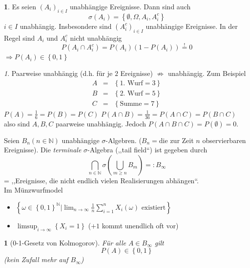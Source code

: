 \documentclass[10pt,a4paper]{report}
\numberwithin{equation}{section}
\numberwithin{figure}{section}
\theoremstyle{plain}
\theoremstyle{definition}
\newtheorem{example}[thm]{\protect\examplename}
\theoremstyle{remark}
\newtheorem{rem}[thm]{\protect\remarkname}
\theoremstyle{plain}
\newtheorem{prop}[thm]{\protect\propositionname}
\providecommand{\examplename}{Beispiel}
\providecommand{\propositionname}{Satz}
\providecommand{\remarkname}{Bemerkung}
\newcommand{\1}{ \mathbb{1} } %
\begin{document}
\begin{example}
  Es seien $\left(A_{i}\right)_{i\in I}$ unabhängige Ereignisse. Dann
  sind auch 
  \[
  \sigma\left(A_{i}\right)=\left\{ \emptyset,\Omega,A_{i},A_{i}^{c}\right\} 
  \]
  $i\in I$ unabhängig. Insbesondere sind $\left(A_{i}^{c}\right)_{i\in I}$
  unabhängige Ereignisse. In der Regel sind $A_{i}$ und $A_{i}^{c}$
  nicht unabhängig
  \[
  P\left(A_{i}\cap A_{i}^{c}\right)=P\left(A_{i}\right)\left(1-P\left(A_{i}\right)\right)\overset{!}{=}0
  \]
  $\Rightarrow P\left(A_{i}\right)\in\left\{ 0,1\right\} $
\end{example}
\begin{rem}
  Paarweise unabhängig (d.h. für je $2$ Ereignisse) $\not\Rightarrow$
  unabhängig. Zum Beispiel
  \begin{eqnarray*}
    A & = & \left\{ \text{1. Wurf}=3\right\} \\
    B & = & \left\{ \text{2. Wurf}=5\right\} \\
    C & = & \left\{ \text{Summe}=7\right\} 
  \end{eqnarray*}
  $P\left(A\right)=\frac{1}{6}=P\left(B\right)=P\left(C\right)$ $P\left(A\cap B\right)=\frac{1}{36}=P\left(A\cap C\right)=P\left(B\cap C\right)$
  also sind $A,B,C$ paarweise unabhängig. Jedoch $P\left(A\cap B\cap C\right)=P\left(\emptyset\right)=0$.

  Seien $B_{n}\left(n\in\mathbb{N}\right)$ unabhängige $\sigma$-Algebren.
  ($B_{n}=$die zur Zeit $n$ observierbaren Ereignisse). Die \emph{terminale}
   $\sigma$-Algebra (,,tail field``) ist gegeben durch
  \[
  \bigcap_{n\in\mathbb{N}}\sigma\left(\bigcup_{m\geq n}B_{m}\right)=:B_{\infty}
  \]
  = ,,Ereignisse, die nicht endlich vielen Realisierungen abhängen``.\\
  Im Münzwurfmodel
  \begin{itemize}
  \item $\left\{ \omega\in\left\{ 0,1\right\} ^{\mathbb{N}}|\lim_{n\to\infty}\frac{1}{n}\sum_{i=1}^{n}X_{i}\left(\omega\right)\text{ existiert}\right\} $
  \item $\limsup_{i\to\infty}\left\{ X_{i}=1\right\} $ ($+1$ kommt unendlich
    oft vor) 
  \end{itemize}
\end{rem}
\begin{prop}[0-1-Gesetz von Kolmogorov]

  Für alle $A\in B_{\infty}$ gilt
  \[
  P\left(A\right)\in\left\{ 0,1\right\} 
  \]
  (kein Zufall mehr auf $B_{\infty}$)
\end{prop}
\end{document}
